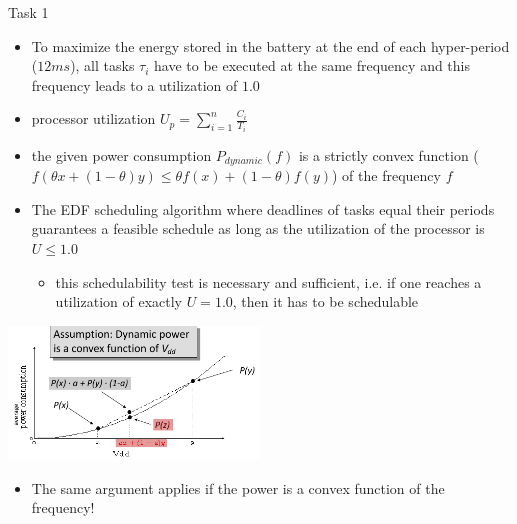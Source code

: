 \begin{frame}[allowframebreaks]{Task 1}{}
  \framebreak
  \begin{tasknoinc}
    \begin{itemize}
      \item To maximize the energy stored in the battery at the end of each hyper-period ($12 ms$), all tasks $ \tau_i$ have to be executed at the same frequency and this frequency leads to a utilization of $1.0$
    \end{itemize}
  \end{tasknoinc}
  \framebreak
  \begin{requirementsnoinc}
    \begin{itemize}
      \item \alert{processor utilization} $\displaystyle U_p = \sum_{i=1}^n \frac{C_i}{T_i}$
      \item the given power consumption $P_{dynamic}(f)$ is a \alert{strictly convex} function ($f(\theta x+(1-\theta) y) \leq \theta f(x)+(1-\theta) f(y)$) of the frequency $f$
      \item The EDF scheduling algorithm where deadlines of tasks equal their periods guarantees a feasible schedule as long as the utilization of the processor is $U \le 1.0$
        \begin{itemize}
          \item this schedulability test is \alert{necessary} and \alert{sufficient}, i.e. if one reaches a utilization of exactly $U = 1.0$, then it has to be schedulable
        \end{itemize}
    \end{itemize}
  \end{requirementsnoinc}
  \begin{requirementsnoinc}
    \centering
    \includegraphics[width=0.5\textwidth]{./figures/task2_power_convex.png}
    \begin{itemize}
        \item The same argument applies if the power is a convex function of the \alert{frequency}!
    \end{itemize}
  \end{requirementsnoinc}
  \begin{solutionnoinc}

\end{solutionnoinc}
\end{frame}
